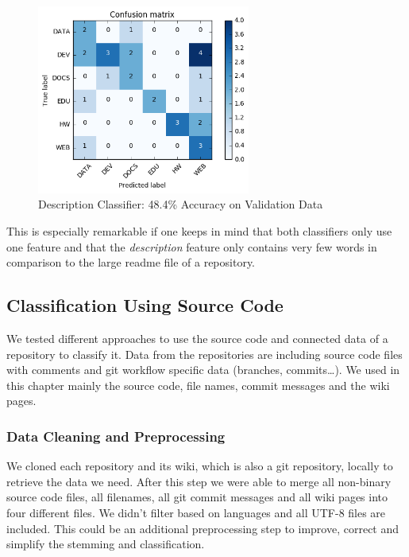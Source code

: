 \documentclass[%
a4paper,
DIV12,
2.5headlines,
bigheadings,
titlepage,
openbib,
]{scrartcl}
\begin{document}
\begin{figure}[H]
	\centering
		\includegraphics[width=7cm]{graphics/confusion-matrix-description-classifier.png}
	\caption{Description Classifier: 48.4\% Accuracy on Validation Data}
	\label{confusion-matrix-description-classifier}
\end{figure}

This is especially remarkable if one keeps in mind that both classifiers only use one feature and that the \textit{description} feature only contains very few words in comparison to the large readme file of a repository.

\subsection{Classification Using Source
Code}\label{classification-using-source-code}

We tested different approaches to use the source code and connected data of a repository to classify it.
Data from the repositories are including source code files with comments and git workflow specific data (branches, commits\ldots{}).
We used in this chapter mainly the source code, file names, commit messages and the wiki pages.

\subsubsection{Data Cleaning and
Preprocessing}\label{data-cleaning-and-preprocessing-2}

We cloned each repository and its wiki, which is also a git repository, locally to retrieve the data we need.
After this step we were able to merge all non-binary source code files, all filenames, all git commit messages and all wiki pages into four different files.
We didn't filter based on languages and all UTF-8 files are included.
This could be an additional preprocessing step to improve, correct and simplify the stemming and classification.
\end{document}

